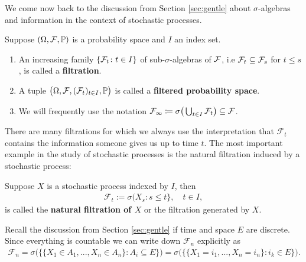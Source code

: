 We come now back to the discussion from Section \ref{sec:gentle} about $\sigma$-algebras and information in the context of stochastic processes.
\begin{ldef}
\begin{deff}
	Suppose $(\Omega, \mathcal F,\P)$ is a probability space and $I$ an index set.
	\begin{enumerate}[label=(\roman*)]
	\item An increasing family $\lbrace \cF_t \colon t \in I \rbrace $ of sub-$\sigma$-algebras of $\cF$, i.e $\cF_t \subseteq \cF_s$ for $t \leq s$, is called a \textbf{filtration}. 
	\item A tuple $\big(\Omega,\cF,(\cF_t)_{t \in I},\mathbb{P}\big)$ is called a \textbf{filtered probability space}.
	\item We will frequently use the notation $\cF_{\infty}\coloneqq \sigma\big( \bigcup_{t\in I}\cF_t\big)\subseteq \mathcal F$.
	\end{enumerate}
\end{deff}
\end{ldef}
There are many filtrations for which we always use the interpretation that $\mathcal F_t$ contains the information someone gives us up to time $t$. The most important example in the study of stochastic processes is the natural filtration induced by a stochastic process:
\begin{ldef}
\begin{deff}\label{ex_ch2_2}
	Suppose $X$ is a stochastic process indexed by $I$, then 
	\begin{align*}
		\mathcal F_t:=\sigma(X_s:s\leq t\}, \quad t\in I,
	\end{align*}
	is called the \textbf{natural filtration of $X$} or the filtration generated by $X$.
\end{deff}
\end{ldef}
Recall the discussion from Section \ref{sec:gentle} if time and space $E$ are discrete. Since everything is countable we can write down $\mathcal F_n$ explicitly as
		\begin{align*}
		\mathcal F_n
		=\sigma\big(\{ \{X_1 \in A_1, ..., X_n \in A_n \} : A_i\subseteq E \}\big)
		=\sigma\big(\{\{X_1=i_1,..., X_n=i_n\}: i_k\in E \}\big).
	\end{align*}	

